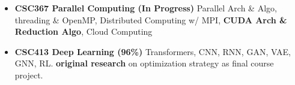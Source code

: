 \documentclass[10pt,a4paper,ragged2e,withhyper]{altacv}
\begin{document}
\begin{paracol}{2}
\begin{itemize}




    \end{itemize}

    \vspace{-3pt}

    \vspace{-5pt}
    \begin{itemize}



        \item  \textbf{CSC367 Parallel Computing (In Progress)}
              Parallel Arch \& Algo, threading \& OpenMP, Distributed Computing w/ MPI,
              \textbf{CUDA Arch \& Reduction Algo}, Cloud Computing

        \item  \textbf{CSC413 Deep Learning (96\%)} Transformers, CNN,
              RNN, GAN, VAE, GNN, RL. \textbf{original research} on optimization
              strategy as final course project.\ 



\end{itemize}
\end{paracol}
\end{document}
